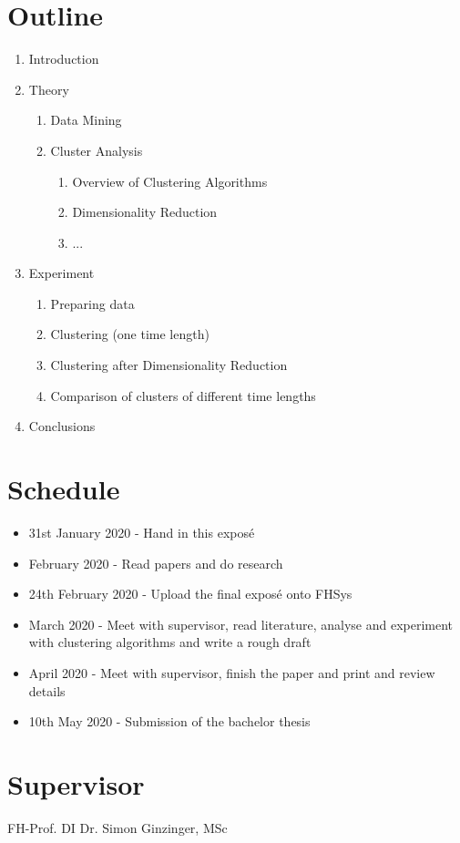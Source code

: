 \documentclass[12pt,a4paper]{article}
\begin{document}
\section*{Outline}

\begin{enumerate}
	\item Introduction
	\item Theory
	\begin{enumerate}
		\item Data Mining 
		\item Cluster Analysis
		\begin{enumerate}
			\item Overview of Clustering Algorithms
			\item Dimensionality Reduction
			\item ...
		\end{enumerate}
	\end{enumerate}
	\item Experiment
	\begin{enumerate}
		\item Preparing data
		\item Clustering (one time length)
		\item Clustering after Dimensionality Reduction
		\item Comparison of clusters of different time lengths
	\end{enumerate}
	\item Conclusions
\end{enumerate}

\nocite{*}
\printbibliography

\section*{Schedule}

\begin{itemize}
	\item 31st January 2020 - Hand in this exposé
	\item February 2020 - Read papers and do research
	\item 24th February 2020 - Upload the final exposé onto FHSys
	\item March 2020 - Meet with supervisor, read literature, analyse and experiment with clustering algorithms and write a rough draft
	\item April 2020 - Meet with supervisor, finish the paper and print and review details
	\item 10th May 2020 - Submission of the bachelor thesis
\end{itemize}

\section*{Supervisor}

FH-Prof. DI Dr. Simon Ginzinger, MSc
\end{document}
